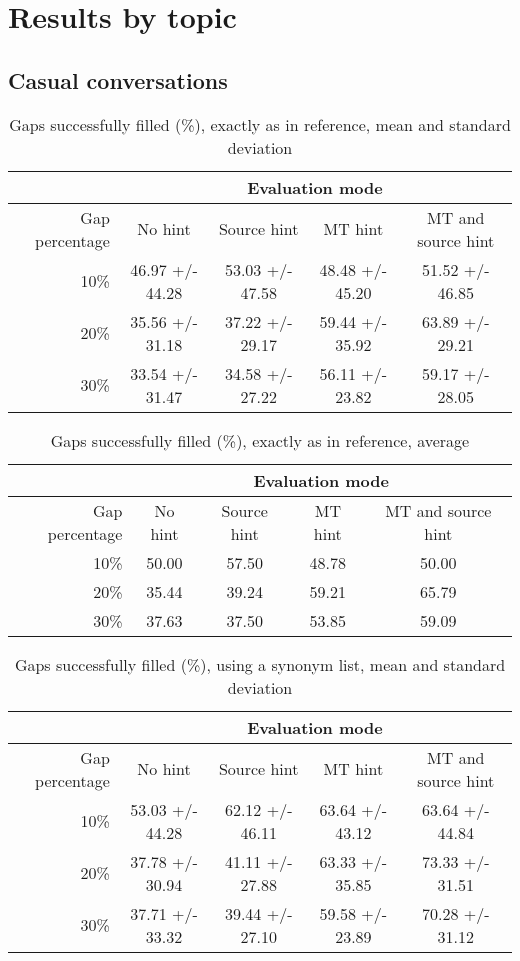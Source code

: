 \documentclass[11pt, oneside]{article}   	%
\begin{document}
\section{Results by topic}
\subsection{Casual conversations}

\begin{table}[H]
\centering
\begin{tabular}{|r |*{4}{c}|}
\hline
 &\multicolumn{4}{c|}{Evaluation mode}\\
\hline
Gap percentage & No hint & Source hint & MT hint & MT and source hint\\
\hline
10\%&46.97 +/- 44.28&53.03 +/- 47.58&48.48 +/- 45.20&51.52 +/- 46.85\\
20\%&35.56 +/- 31.18&37.22 +/- 29.17&59.44 +/- 35.92&63.89 +/- 29.21\\
30\%&33.54 +/- 31.47&34.58 +/- 27.22&56.11 +/- 23.82&59.17 +/- 28.05\\
\hline
\end{tabular}
\caption {Gaps successfully filled (\%), exactly as in reference, mean and standard deviation} \label{tab:title} 
\end{table}

\begin{table}[H]
\centering
\begin{tabular}{|r |*{4}{c}|}
\hline
 &\multicolumn{4}{c|}{Evaluation mode}\\
\hline
Gap percentage & No hint & Source hint & MT hint & MT and source hint\\
\hline
10\%&50.00&57.50&48.78&50.00\\
20\%&35.44&39.24&59.21&65.79\\
30\%&37.63&37.50&53.85&59.09\\
\hline
\end{tabular}
\caption {Gaps successfully filled (\%), exactly as in reference, average} \label{tab:title} 
\end{table}

\begin{table}[H]
\centering
\begin{tabular}{|r |*{4}{c}|}
\hline
 &\multicolumn{4}{c|}{Evaluation mode}\\
\hline
Gap percentage & No hint & Source hint & MT hint & MT and source hint\\
\hline
10\%&53.03 +/- 44.28&62.12 +/- 46.11&63.64 +/- 43.12&63.64 +/- 44.84\\
20\%&37.78 +/- 30.94&41.11 +/- 27.88&63.33 +/- 35.85&73.33 +/- 31.51\\
30\%&37.71 +/- 33.32&39.44 +/- 27.10&59.58 +/- 23.89&70.28 +/- 31.12\\
\hline
\end{tabular}
\caption {Gaps successfully filled (\%), using a synonym list, mean and standard deviation} \label{tab:title} 
\end{table}
\end{document}
